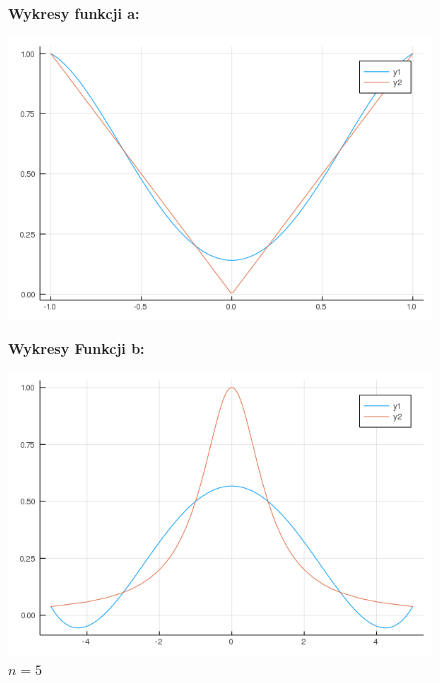 \documentclass[11pt, a4paper]{article}
\begin{document}
    \begin{figure}[H]
        \captionsetup{labelformat = empty}
        \begin{minipage}{0.5\textwidth}
            \centerline{\textbf{Wykresy funkcji a:}}
            \caption{$n=5$}
            \centering
            \includegraphics[width=\linewidth]{plot-6_a_n5}
        \end{minipage}
        \begin{minipage}{0.5\textwidth}
            \centerline{\textbf{Wykresy Funkcji b:}}
            \caption{$n=5$}
            \centering
            \includegraphics[width=\linewidth]{plot-6_b_n5}
        \end{minipage}


\end{figure}
\end{document}
